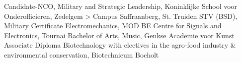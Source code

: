 %
%
%


\begin{scholarship}
					{Candidate-NCO, Military and Strategic Leadership, Koninklijke School voor Onderofficieren, Zedelgem > Campus Saffraanberg, St. Truiden}
                    {STV (BSD), Military Certificate Electromechanics, MOD BE Centre for Signals and Electronics, Tournai}
					{Bachelor of Arts, Music, Genkse Academie voor Kunst}
					{Associate Diploma Biotechnology with electives in the agro-food industry \& environmental conservation, Biotechnicum Bocholt}
\end{scholarship}
